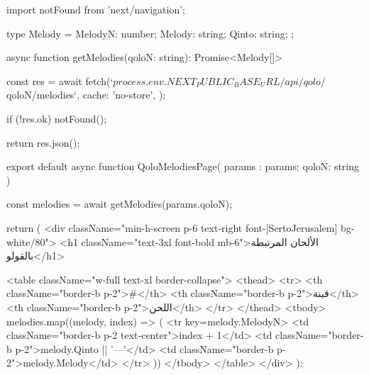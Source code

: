 import { notFound } from 'next/navigation';

type Melody = {
  MelodyN: number;
  Melody: string;
  Qinto: string;
};

async function getMelodies(qoloN: string): Promise<Melody[]> {
  const res = await fetch(`${process.env.NEXT_PUBLIC_BASE_URL}/api/qolo/${qoloN}/melodies`, {
    cache: 'no-store',
  });

  if (!res.ok) {
    notFound();
  }

  return res.json();
}

export default async function QoloMelodiesPage({ params }: { params: { qoloN: string } }) {
  const melodies = await getMelodies(params.qoloN);

  return (
    <div className="min-h-screen p-6 text-right font-[SertoJerusalem] bg-white/80">
      <h1 className="text-3xl font-bold mb-6">الألحان المرتبطة بالقولو</h1>

      <table className="w-full text-xl border-collapse">
        <thead>
          <tr>
            <th className="border-b p-2">#</th>
            <th className="border-b p-2">قينة</th>
            <th className="border-b p-2">اللحن</th>
          </tr>
        </thead>
        <tbody>
          {melodies.map((melody, index) => (
            <tr key={melody.MelodyN}>
              <td className="border-b p-2 text-center">{index + 1}</td>
              <td className="border-b p-2">{melody.Qinto || '—'}</td>
              <td className="border-b p-2">{melody.Melody}</td>
            </tr>
          ))}
        </tbody>
      </table>
    </div>
  );
}
